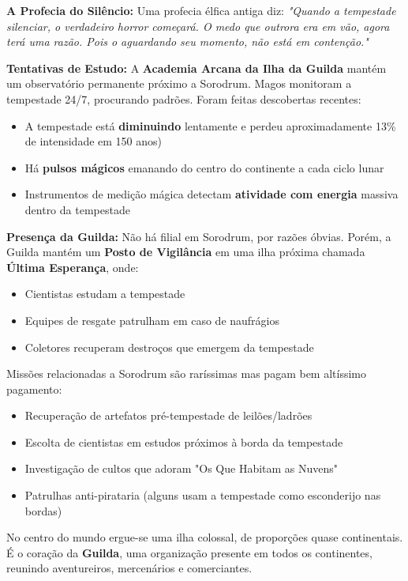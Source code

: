 \textbf{\ringmfamily A Profecia do Silêncio:}
Uma profecia élfica antiga diz:
\textit{"Quando a tempestade silenciar, o verdadeiro horror começará. O medo que outrora era em vão, agora terá uma razão. Pois o aguardando seu momento, não está em contenção."}

\textbf{\ringmfamily Tentativas de Estudo:}
A \textbf{Academia Arcana da Ilha da Guilda} mantém um observatório permanente próximo a Sorodrum. Magos monitoram a tempestade 24/7, procurando padrões. Foram feitas descobertas recentes:
\begin{itemize}
    \item A tempestade está \textbf{diminuindo} lentamente e perdeu aproximadamente 13\% de intensidade em 150 anos)
    \item Há \textbf{pulsos mágicos} emanando do centro do continente a cada ciclo lunar
    \item Instrumentos de medição mágica detectam \textbf{atividade com energia} massiva dentro da tempestade
\end{itemize}

\textbf{\ringmfamily Presença da Guilda:}
Não há filial em Sorodrum, por razões óbvias. Porém, a Guilda mantém um \textbf{Posto de Vigilância} em uma ilha próxima chamada \textbf{Última Esperança}, onde:
\begin{itemize}
    \item Cientistas estudam a tempestade
    \item Equipes de resgate patrulham em caso de naufrágios
    \item Coletores recuperam destroços que emergem da tempestade
\end{itemize}

Missões relacionadas a Sorodrum são raríssimas mas pagam bem altíssimo pagamento:
\begin{itemize}
    \item Recuperação de artefatos pré-tempestade de leilões/ladrões
    \item Escolta de cientistas em estudos próximos à borda da tempestade
    \item Investigação de cultos que adoram "Os Que Habitam as Nuvens"
    \item Patrulhas anti-pirataria (alguns usam a tempestade como esconderijo nas bordas)
\end{itemize}

No centro do mundo ergue-se uma ilha colossal, de proporções quase continentais. É o coração da \textbf{Guilda}, uma organização presente em todos os continentes, reunindo aventureiros, mercenários e comerciantes.

